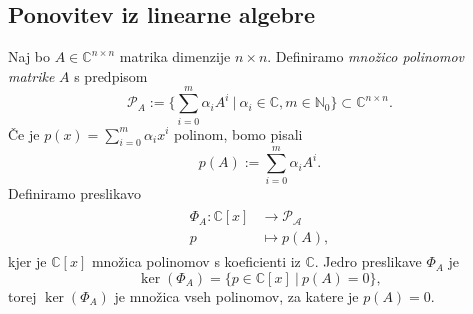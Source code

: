 \documentclass[mat1]{fmfdelo}
\newcommand{\N}{\mathbb N}
\newcommand{\C}{\mathbb C}
\begin{document}
\subsection{Ponovitev iz linearne algebre}\label{linearnaAlgebra}
Naj bo $A \in \C^{n \times n}$ matrika dimenzije $n \times n$. Definiramo \emph{množico polinomov matrike} $A$ s predpisom
\begin{equation}
    \mathcal{P}_A := \Big\{ \sum_{i=0}^m \alpha_i A^i\ |\  \alpha_i \in \C, m \in \N_0 \Big\} \subset \C^{n \times n}.
\end{equation}
Če je $p(x) = \sum_{i=0}^m \alpha_i x^i$ polinom, bomo pisali
\begin{equation}
    p(A) := \sum_{i=0}^m \alpha_i A^i.
\end{equation}
Definiramo preslikavo
\begin{align}
\begin{split}
    \Phi_A : \C [x] &\longrightarrow \mathcal{P_A} \\
    p &\longmapsto p(A),
\end{split}
\end{align}
kjer je $\C [x]$ množica polinomov s koeficienti iz $\C$. Jedro preslikave $\Phi_A$ je
\begin{equation}
    \ker (\Phi_A) = \Big\{ p \in \C [x] \ | \  p(A) = 0 \Big\},
\end{equation}
torej $\ker(\Phi_A)$ je množica vseh polinomov, za katere je $p(A) = 0$.
\end{document}
